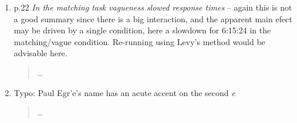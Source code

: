 \documentclass{tufte-handout}
\begin{document}
\begin{enumerate}
\item p.22 \emph{In the matching task vagueness slowed response times} -- again this is not a good summary since there is a big interaction, and the apparent main efect may be driven by a single condition, here a slowdown for 6:15:24 in the matching/vague condition. Re-running using Levy's method would be advisable here.
\begin{quote}\ldots\end{quote}

\item Typo: Paul Egr\a'e's name has an acute accent on the second \emph{e}
\begin{quote}\ldots\end{quote}

\end{enumerate}
\end{document}
